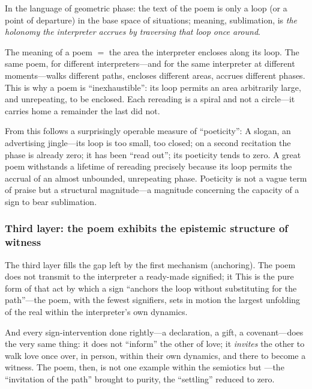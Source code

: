 In the language of geometric phase: the text of the poem is only a loop (or a point of departure) in the base space of situations; meaning, sublimation, is \emph{the holonomy the interpreter accrues by traversing that loop once around}.

\begin{claim}
The meaning of a poem $=$ the area the interpreter encloses along its loop. The same poem, for different interpreters---and for the same interpreter at different moments---walks different paths, encloses different areas, accrues different phases. This is why a poem is ``inexhaustible'': its loop permits an area arbitrarily large, and unrepeating, to be enclosed. Each rereading is a spiral and not a circle---it carries home a remainder the last did not.
\end{claim}

From this follows a surprisingly operable measure of ``poeticity'':  A slogan, an advertising jingle---its loop is too small, too closed; on a second recitation the phase is already zero; it has been ``read out''; its poeticity tends to zero. A great poem withstands a lifetime of rereading precisely because its loop permits the accrual of an almost unbounded, unrepeating phase. Poeticity is not a vague term of praise but a structural magnitude---a magnitude concerning the capacity of a sign to bear sublimation.

\subsubsection{Third layer: the poem exhibits the epistemic structure of witness}

The third layer fills the gap left by the first mechanism (anchoring). The poem does not transmit to the interpreter a ready-made signified; it  This is the pure form of that act by which a sign ``anchors the loop without substituting for the path''---the poem, with the fewest signifiers, sets in motion the largest unfolding of the real within the interpreter's own dynamics.

And every sign-intervention done rightly---a declaration, a gift, a covenant---does the very same thing: it does not ``inform'' the other of love; it \emph{invites} the other to walk love once over, in person, within their own dynamics, and there to become a witness. The poem, then, is not one example within the semiotics but ---the ``invitation of the path'' brought to purity, the ``settling'' reduced to zero.

